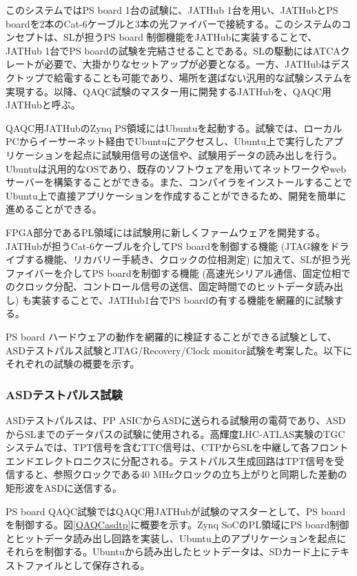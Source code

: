 このシステムではPS board 1台の試験に、JATHub 1台を用い、JATHubとPS boardを2本のCat-6ケーブルと3本の光ファイバーで接続する。このシステムのコンセプトは、SLが担うPS board 制御機能をJATHubに実装することで、JATHub 1台でPS boardの試験を完結させることである。SLの駆動にはATCAクレートが必要で、大掛かりなセットアップが必要となる。一方、JATHubはデスクトップで給電することも可能であり、場所を選ばない汎用的な試験システムを実現する。以降、QAQC試験のマスター用に開発するJATHubを、QAQC用JATHubと呼ぶ。

QAQC用JATHubのZynq PS領域にはUbuntuを起動する。試験では、ローカルPCからイーサーネット経由でUbuntuにアクセスし、Ubuntu上で実行したアプリケーションを起点に試験用信号の送信や、試験用データの読み出しを行う。Ubuntuは汎用的なOSであり、既存のソフトウェアを用いてネットワークやwebサーバーを構築することができる。また、コンパイラをインストールすることでUbuntu上で直接アプリケーションを作成することができるため、開発を簡単に進めることができる。

FPGA部分であるPL領域には試験用に新しくファームウェアを開発する。
JATHubが担うCat-6ケーブルを介してPS boardを制御する機能 (JTAG線をドライブする機能、リカバリー手続き、クロックの位相測定) に加えて、SLが担う光ファイバーを介してPS boardを制御する機能 (高速光シリアル通信、固定位相でのクロック分配、コントロール信号の送信、固定時間でのヒットデータ読み出し) も実装することで、JATHub1台でPS boardの有する機能を網羅的に試験する。

PS board ハードウェアの動作を網羅的に検証することができる試験として、ASDテストパルス試験とJTAG/Recovery/Clock monitor試験を考案した。以下にそれぞれの試験の概要を示す。

\subsubsection{ASDテストパルス試験}
\baselineskip
\label{subsubsec_testpulse}
ASDテストパルスは、PP ASICからASDに送られる試験用の電荷であり、ASDからSLまでのデータパスの試験に使用される。高輝度LHC-ATLAS実験のTGCシステムでは、TPT信号を含むTTC信号は、CTPからSLを中継して各フロントエンドエレクトロニクスに分配される。テストパルス生成回路はTPT信号を受信すると、参照クロックである40 MHzクロックの立ち上がりと同期した差動の矩形波をASDに送信する。


PS board QAQC試験ではQAQC用JATHubが試験のマスターとして、PS board を制御する。図\ref{QAQCasdtp}に概要を示す。Zynq SoCのPL領域にPS board制御とヒットデータ読み出し回路を実装し、Ubuntu上のアプリケーションを起点にそれらを制御する。Ubuntuから読み出したヒットデータは、SDカード上にテキストファイルとして保存される。

